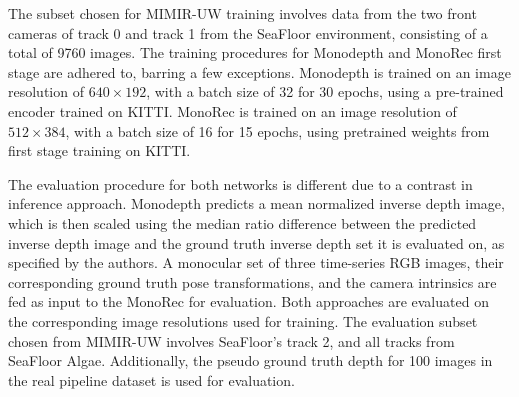 The subset chosen for MIMIR-UW training involves data from the two front cameras of track 0 and track 1 from the SeaFloor environment, consisting of a total of 9760 images. The training procedures for Monodepth and MonoRec first stage are adhered to, barring a few exceptions. Monodepth is trained on an image resolution of $640\times192$, with a batch size of 32 for 30 epochs, using a pre-trained encoder trained on KITTI. MonoRec is trained on an image resolution of $512\times384$, with a batch size of 16 for 15 epochs, using pretrained weights from first stage training on KITTI.

The evaluation procedure for both networks is different due to a contrast in inference approach. Monodepth predicts a mean normalized inverse depth image, which is then scaled using the median ratio difference between the predicted inverse depth image and the ground truth inverse depth set it is evaluated on, as specified by the authors\cite{monodepth2}. A monocular set of three time-series RGB images, their corresponding ground truth pose transformations, and the camera intrinsics are fed as input to the MonoRec for evaluation. Both approaches are evaluated on the corresponding image resolutions used for training. The evaluation subset chosen from MIMIR-UW involves SeaFloor's track 2, and all tracks from SeaFloor Algae. Additionally, the pseudo ground truth depth for 100 images in the real pipeline dataset is used for evaluation. %


